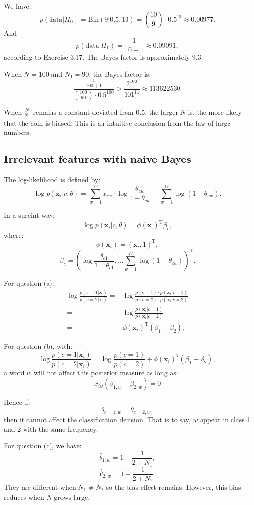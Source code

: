 \documentclass[UTF8]{ctexart}
\begin{document}
We have:
$$p(\text{data}|H_{0})=\text{Bin}(9|0.5,10)=\binom{10}{9}\cdot 0.5^{10}\approx 0.00977.$$
And
$$p(\text{data}|H_{1})=\frac{1}{10+1}\approx 0.09091,$$
according to Exercise 3.17.
The Bayes factor is approximately $9.3$.

When $N=100$ and $N_{1}=90$, the Bayes factor is:
$$\frac{\frac{1}{100+1}}{\binom{100}{90}\cdot 0.5^{100}}>\frac{2^{100}}{101^{11}}\approx 113622530.$$

When $\frac{N}{N_{1}}$ remains a constant deviated from 0.5, the larger $N$ is, the more likely that the coin is biased.
This is an intuitive conclusion from the law of large numbers. 


\subsection{Irrelevant features with naive Bayes}
The log-likelihood is defined by:
$$\log p(\textbf{x}_{i}|c,\theta)=\sum_{w=1}^{W}x_{iw}\cdot \log \frac{\theta_{cw}}{1-\theta_{cw}}+\sum_{w=1}^{W}\log (1-\theta_{cw}).$$

In a succint way:
$$\log p(\textbf{x}_{i}|c,\theta)=\phi(\textbf{x}_{i})^{\text{T}} \beta_{c},$$
where:
$$\phi(\textbf{x}_{i})=(\textbf{x}_{i},1)^{\text{T}},$$
$$\beta_{c}=\left(\log \frac{\theta_{c1}}{1-\theta_{c1}},...\sum_{w=1}^{W}\log(1-\theta_{cw})\right)^{\text{T}}.$$

For question (a):
\begin{align}
\log \frac{p(c=1|\textbf{x}_{i})}{p(c=2|\textbf{x}_{i})} =&\log \frac{p(c=1)\cdot p(\textbf{x}_{i}|c=1)}{p(c=2)\cdot p(\textbf{x}_{i}|c=2)} \nonumber \\
=&\log \frac{p(\textbf{x}_{i}|c=1)}{p(\textbf{x}_{i}|c=2)} \nonumber \\
=&\phi(\textbf{x}_{i})^{\text{T}}(\beta_{1}-\beta_{2}). \nonumber
\end{align}

For question (b), with:
$$\log \frac{p(c=1|\textbf{x}_{i})}{p(c=2|\textbf{x}_{i})} = \log \frac{p(c=1)}{p(c=2)} +  \phi(\textbf{x}_{i})^{T}(\beta_{1}-\beta_{2}),$$
a word $w$ will not affect this posterior measure as long as:
$$x_{iw}(\beta_{1,w}-\beta_{2,w})=0$$

Hence if:
$$\theta_{c=1,w}=\theta_{c=2,w},$$
then it cannot affect the classification decision.
That is to say, $w$ appear in class 1 and 2 with the same frequency. 

For question (c), we have:
$$\hat{\theta}_{1,w}=1-\frac{1}{2+N_{1}},$$
$$\hat{\theta}_{2,w}=1-\frac{1}{2+N_{2}}.$$
They are different when $N_{1} \neq N_{2}$ so the bias effect remains. 
However, this bias reduces when $N$ grows large.
\end{document}
